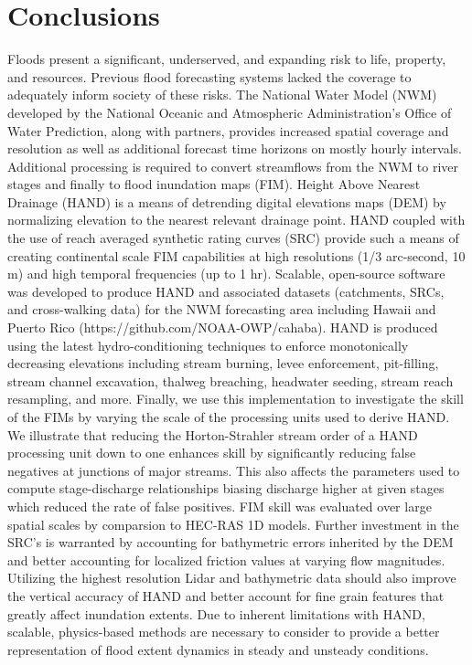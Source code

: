 \section{Conclusions}
\label{sec:conclusions}
%
Floods present a significant, underserved, and expanding risk to life, property, and resources.
Previous flood forecasting systems lacked the coverage to adequately inform society of these risks.
The National Water Model (NWM) developed by the National Oceanic and Atmospheric Administration's Office of Water Prediction, along with partners, provides increased spatial coverage and resolution as well as additional forecast time horizons on mostly hourly intervals.
Additional processing is required to convert streamflows from the NWM to river stages and finally to flood inundation maps (FIM).
Height Above Nearest Drainage (HAND) is a means of detrending digital elevations maps (DEM) by normalizing elevation to the nearest relevant drainage point.
HAND coupled with the use of reach averaged synthetic rating curves (SRC) provide such a means of creating continental scale FIM capabilities at high resolutions (1/3 arc-second, 10 m) and high temporal frequencies (up to 1 hr).
Scalable, open-source software was developed to produce HAND and associated datasets (catchments, SRCs, and cross-walking data) for the NWM forecasting area including Hawaii and Puerto Rico (https://github.com/NOAA-OWP/cahaba).
HAND is produced using the latest hydro-conditioning techniques to enforce monotonically decreasing elevations including stream burning, levee enforcement, pit-filling, stream channel excavation, thalweg breaching, headwater seeding, stream reach resampling, and more. 
Finally, we use this implementation to investigate the skill of the FIMs by varying the scale of the processing units used to derive HAND.
We illustrate that reducing the Horton-Strahler stream order of a HAND processing unit down to one enhances skill by significantly reducing false negatives at junctions of major streams.
This also affects the parameters used to compute stage-discharge relationships biasing discharge higher at given stages which reduced the rate of false positives.
FIM skill was evaluated over large spatial scales by comparsion to HEC-RAS 1D models.
Further investment in the SRC's is warranted by accounting for bathymetric errors inherited by the DEM and better accounting for localized friction values at varying flow magnitudes.
Utilizing the highest resolution Lidar and bathymetric data should also improve the vertical accuracy of HAND and better account for fine grain features that greatly affect inundation extents.
Due to inherent limitations with HAND, scalable, physics-based methods are necessary to consider to provide a better representation of flood extent dynamics in steady and unsteady conditions. 
%
